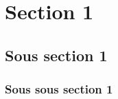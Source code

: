 \documentclass{IMTA-template}
\begin{document}


\maketitle
\tableofcontents

\newpage
\section{Section 1}
\subsection{Sous section 1}
\subsubsection{Sous sous section 1}

\clearpage
\end{document}
